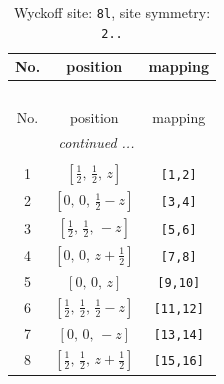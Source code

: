\documentclass[fleqn,8pt]{jsarticle}
\begin{document}
\begin{longtable}{ccc}
\caption{Wyckoff site: {\tt 8l}, site symmetry: {\tt 2..}}
 \\
 \hline \hline
No. & position & mapping \\ \hline \endfirsthead

\multicolumn{2}{l}{\tablename\ \thetable{}} \\
 \hline \hline
No. & position & mapping \\ \hline \endhead

 \hline \hline
\multicolumn{2}{r}{\footnotesize\it continued ...} \\ \endfoot

 \hline \hline
\multicolumn{2}{r}{} \\ \endlastfoot

1 & $\left[ \frac{1}{2},\, \frac{1}{2},\, z \right]$ & {\tt [1,2]} \\ \hline
2 & $\left[ 0,\, 0,\, \frac{1}{2} - z \right]$ & {\tt [3,4]} \\ \hline
3 & $\left[ \frac{1}{2},\, \frac{1}{2},\, - z \right]$ & {\tt [5,6]} \\ \hline
4 & $\left[ 0,\, 0,\, z + \frac{1}{2} \right]$ & {\tt [7,8]} \\ \hline
5 & $\left[ 0,\, 0,\, z \right]$ & {\tt [9,10]} \\ \hline
6 & $\left[ \frac{1}{2},\, \frac{1}{2},\, \frac{1}{2} - z \right]$ & {\tt [11,12]} \\ \hline
7 & $\left[ 0,\, 0,\, - z \right]$ & {\tt [13,14]} \\ \hline
8 & $\left[ \frac{1}{2},\, \frac{1}{2},\, z + \frac{1}{2} \right]$ & {\tt [15,16]} \\
\end{longtable}
\renewcommand{\arraystretch}{1.2}
\end{document}
